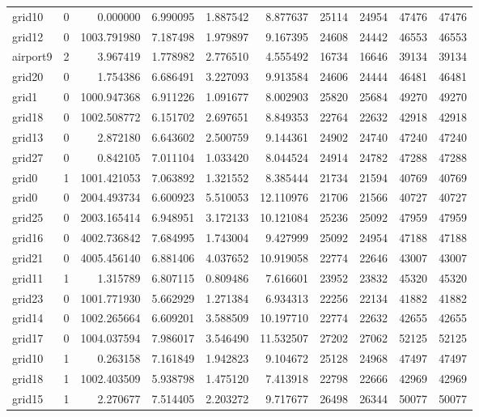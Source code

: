 \begin{longtable}{|l|r|r|r|r|r|r|r|r|r|}
grid10 & 0 & 0.000000 & 6.990095 & 1.887542 & 8.877637 & 25114 & 24954 & 47476 & 47476 \\
grid12 & 0 & 1003.791980 & 7.187498 & 1.979897 & 9.167395 & 24608 & 24442 & 46553 & 46553 \\
airport9 & 2 & 3.967419 & 1.778982 & 2.776510 & 4.555492 & 16734 & 16646 & 39134 & 39134 \\
grid20 & 0 & 1.754386 & 6.686491 & 3.227093 & 9.913584 & 24606 & 24444 & 46481 & 46481 \\
grid1 & 0 & 1000.947368 & 6.911226 & 1.091677 & 8.002903 & 25820 & 25684 & 49270 & 49270 \\
grid18 & 0 & 1002.508772 & 6.151702 & 2.697651 & 8.849353 & 22764 & 22632 & 42918 & 42918 \\
grid13 & 0 & 2.872180 & 6.643602 & 2.500759 & 9.144361 & 24902 & 24740 & 47240 & 47240 \\
grid27 & 0 & 0.842105 & 7.011104 & 1.033420 & 8.044524 & 24914 & 24782 & 47288 & 47288 \\
grid0 & 1 & 1001.421053 & 7.063892 & 1.321552 & 8.385444 & 21734 & 21594 & 40769 & 40769 \\
grid0 & 0 & 2004.493734 & 6.600923 & 5.510053 & 12.110976 & 21706 & 21566 & 40727 & 40727 \\
grid25 & 0 & 2003.165414 & 6.948951 & 3.172133 & 10.121084 & 25236 & 25092 & 47959 & 47959 \\
grid16 & 0 & 4002.736842 & 7.684995 & 1.743004 & 9.427999 & 25092 & 24954 & 47188 & 47188 \\
grid21 & 0 & 4005.456140 & 6.881406 & 4.037652 & 10.919058 & 22774 & 22646 & 43007 & 43007 \\
grid11 & 1 & 1.315789 & 6.807115 & 0.809486 & 7.616601 & 23952 & 23832 & 45320 & 45320 \\
grid23 & 0 & 1001.771930 & 5.662929 & 1.271384 & 6.934313 & 22256 & 22134 & 41882 & 41882 \\
grid14 & 0 & 1002.265664 & 6.609201 & 3.588509 & 10.197710 & 22774 & 22632 & 42655 & 42655 \\
grid17 & 0 & 1004.037594 & 7.986017 & 3.546490 & 11.532507 & 27202 & 27062 & 52125 & 52125 \\
grid10 & 1 & 0.263158 & 7.161849 & 1.942823 & 9.104672 & 25128 & 24968 & 47497 & 47497 \\
grid18 & 1 & 1002.403509 & 5.938798 & 1.475120 & 7.413918 & 22798 & 22666 & 42969 & 42969 \\
grid15 & 1 & 2.270677 & 7.514405 & 2.203272 & 9.717677 & 26498 & 26344 & 50077 & 50077 \\

\end{longtable}
